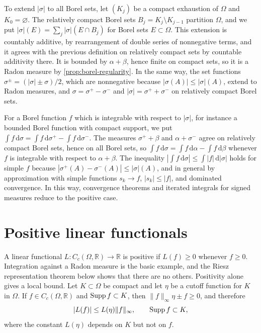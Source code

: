 To extend $|\sigma|$ to all Borel sets, let $(K_j)$ be a compact exhaustion of $\Omega$ and $K_0=\varnothing$. The relatively compact Borel sets $B_j=K_j\setminus K_{j-1}$ partition $\Omega$, and we put $|\sigma|(E)=\sum_j|\sigma|(E\cap B_j)$ for Borel sets $E\subset\Omega$. This extension is countably additive, by rearrangement of double series of nonnegative terms, and it agrees with the previous definition on relatively compact sets by countable additivity there. It is bounded by $\alpha+\beta$, hence finite on compact sets, so it is a Radon measure by \cref{prop:borel-regularity}. In the same way, the set functions $\sigma^\pm=(|\sigma|\pm\sigma)/2$, which are nonnegative because $|\sigma(A)|\leq|\sigma|(A)$, extend to Radon measures, and $\sigma=\sigma^+-\sigma^-$ and $|\sigma|=\sigma^++\sigma^-$ on relatively compact Borel sets.

For a Borel function $f$ which is integrable with respect to $|\sigma|$, for instance a bounded Borel function with compact support, we put $\int f\,\mathrm d\sigma=\int f\,\mathrm d\sigma^+-\int f\,\mathrm d\sigma^-$. The measures $\sigma^++\beta$ and $\alpha+\sigma^-$ agree on relatively compact Borel sets, hence on all Borel sets, so $\int f\,\mathrm d\sigma=\int f\,\mathrm d\alpha-\int f\,\mathrm d\beta$ whenever $f$ is integrable with respect to $\alpha+\beta$. The inequality $|\int f\,\mathrm d\sigma|\leq\int|f|\,\mathrm d|\sigma|$ holds for simple $f$ because $|\sigma^+(A)-\sigma^-(A)|\leq|\sigma|(A)$, and in general by approximation with simple functions $s_k\to f$, $|s_k|\leq|f|$, and dominated convergence. In this way, convergence theorems and iterated integrals for signed measures reduce to the positive case.

\section{Positive linear functionals}
\label{sec:positive-functionals}
A linear functional $L\colon C_c(\Omega,\mathbb R)\to\mathbb R$ is positive if $L(f)\geq0$ whenever $f\geq0$. Integration against a Radon measure is the basic example, and the Riesz representation theorem below shows that there are no others. Positivity alone gives a local bound. Let $K\subset\Omega$ be compact and let $\eta$ be a cutoff function for $K$ in $\Omega$. If $f\in C_c(\Omega,\mathbb R)$ and $\operatorname{Supp} f\subset K$, then $\|f\|_\infty\eta\pm f\geq0$, and therefore
\begin{equation}\label{eq:positive-functional-bound}
 |L(f)|\leq L(\eta)\|f\|_\infty,\qquad \operatorname{Supp} f\subset K,
\end{equation}
where the constant $L(\eta)$ depends on $K$ but not on $f$.

